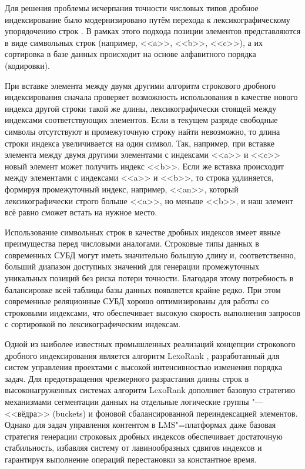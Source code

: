 \documentclass[coursework]{SCWorks}
\begin{document}
Для решения проблемы исчерпания точности числовых типов дробное индексирование было модернизировано путём перехода к лексикографическому упорядочению строк \cite{fractional_indexing}. В рамках этого подхода позиции элементов представляются в виде символьных строк (например, <<a>>, <<b>>, <<c>>), а их сортировка в базе данных происходит на основе алфавитного порядка (кодировки).

При вставке элемента между двумя другими алгоритм строкового дробного индексирования сначала проверяет возможность использования в качестве нового индекса другой строки такой же длины, лексикографически стоящей между индексами соответствующих элементов. Если в текущем разряде свободные символы отсутствуют и промежуточную строку найти невозможно, то длина строки индекса увеличивается на один символ. Так, например, при вставке элемента между двумя другими элементами с индексами <<a>> и <<c>> новый элемент может получить индекс <<b>>. Если же вставка происходит между элементами с индексами <<a>> и <<b>>, то строка удлиняется, формируя промежуточный индекс, например, <<an>>, который лексикографически строго больше <<a>>, но меньше <<b>>, и наш элемент всё равно сможет встать на нужное место.

Использование символьных строк в качестве дробных индексов имеет явные преимущества перед числовыми аналогами. Строковые типы данных в современных СУБД могут иметь значительно большую длину и, соответственно, больший диапазон доступных значений для генерации промежуточных уникальных позиций без риска потери точности. Благодаря этому потребность в балансировке всей таблицы базы данных появляется крайне редко. При этом современные реляционные СУБД хорошо оптимизированы для работы со строковыми индексами, что обеспечивает высокую скорость выполнения запросов с сортировкой по лексикографическим индексам.

Одной из наиболее известных промышленных реализаций концепции строкового дробного индексирования является алгоритм LexoRank \cite{lexorank}, разработанный для систем управления проектами с высокой интенсивностью изменения порядка задач. Для предотвращения чрезмерного разрастания длины строк в высоконагруженных системах алгоритм LexoRank дополняет базовую стратегию механизмами сегментации данных на отдельные логические группы "--- <<вёдра>> (buckets) и фоновой сбалансированной переиндексацией элементов. Однако для задач управления контентом в LMS"=платформах даже базовая стратегия генерации строковых дробных индексов обеспечивает достаточную стабильность, избавляя систему от лавинообразных сдвигов индексов и гарантируя выполнение операций перестановки за константное время.
\end{document}
